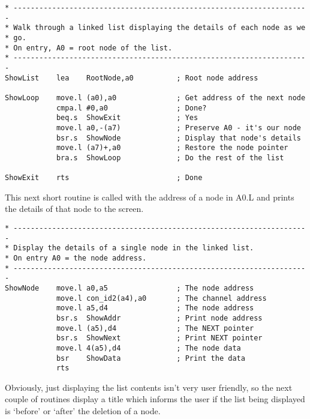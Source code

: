 \begin{lstlisting}[firstnumber=last,caption={Single Linked List - Demo Code - Show List}]
* ---------------------------------------------------------------------
* Walk through a linked list displaying the details of each node as we
* go.
* On entry, A0 = root node of the list.
* ---------------------------------------------------------------------
ShowList    lea    RootNode,a0          ; Root node address

ShowLoop    move.l (a0),a0              ; Get address of the next node
            cmpa.l #0,a0                ; Done?
            beq.s  ShowExit             ; Yes
            move.l a0,-(a7)             ; Preserve A0 - it's our node
            bsr.s  ShowNode             ; Display that node's details
            move.l (a7)+,a0             ; Restore the node pointer 
            bra.s  ShowLoop             ; Do the rest of the list

ShowExit    rts                         ; Done
\end{lstlisting}

This next short routine is called with the address of a node in A0.L
    and prints the details of that node to the screen.

\begin{lstlisting}[firstnumber=last,caption={Single Linked List - Demo Code - Show Node}]
* ---------------------------------------------------------------------
* Display the details of a single node in the linked list.
* On entry A0 = the node address.
* ---------------------------------------------------------------------
ShowNode    move.l a0,a5                ; The node address
            move.l con_id2(a4),a0       ; The channel address
            move.l a5,d4                ; The node address
            bsr.s  ShowAddr             ; Print node address
            move.l (a5),d4              ; The NEXT pointer
            bsr.s  ShowNext             ; Print NEXT pointer
            move.l 4(a5),d4             ; The node data
            bsr    ShowData             ; Print the data
            rts
\end{lstlisting}

Obviously, just displaying the list contents isn't very user
    friendly, so the next couple of routines display a title which informs
    the user if the list being displayed is `before' or `after' the deletion
    of a node.

